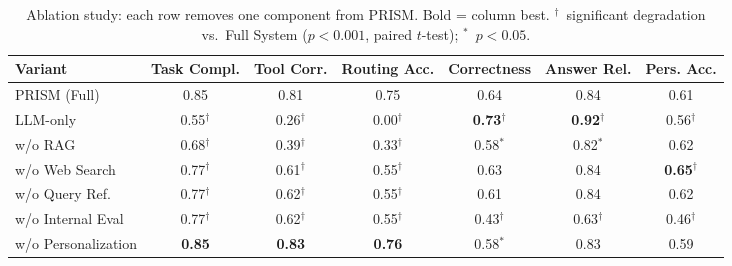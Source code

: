 \begin{table}[t]
\centering
\small
\caption{Ablation study: each row removes one component from PRISM. Bold = column best. $^\dagger$~significant degradation vs.\ Full System ($p < 0.001$, paired $t$-test); $^*$~$p < 0.05$.}
\label{tab:ablation}
\begin{tabular}{@{}lcccccc@{}}
\toprule
Variant & Task Compl. & Tool Corr. & Routing Acc. & Correctness & Answer Rel. & Pers. Acc. \\
\midrule
\textsc{PRISM} (Full) & 0.85 & 0.81 & 0.75 & 0.64 & 0.84 & 0.61 \\
LLM-only & 0.55$^\dagger$ & 0.26$^\dagger$ & 0.00$^\dagger$ & \textbf{0.73}$^\dagger$ & \textbf{0.92}$^\dagger$ & 0.56$^\dagger$ \\
\midrule
w/o RAG & 0.68$^\dagger$ & 0.39$^\dagger$ & 0.33$^\dagger$ & 0.58$^*$ & 0.82$^*$ & 0.62 \\
w/o Web Search & 0.77$^\dagger$ & 0.61$^\dagger$ & 0.55$^\dagger$ & 0.63 & 0.84 & \textbf{0.65}$^\dagger$ \\
w/o Query Ref. & 0.77$^\dagger$ & 0.62$^\dagger$ & 0.55$^\dagger$ & 0.61 & 0.84 & 0.62 \\
w/o Internal Eval & 0.77$^\dagger$ & 0.62$^\dagger$ & 0.55$^\dagger$ & 0.43$^\dagger$ & 0.63$^\dagger$ & 0.46$^\dagger$ \\
w/o Personalization & \textbf{0.85} & \textbf{0.83} & \textbf{0.76} & 0.58$^*$ & 0.83 & 0.59 \\
\bottomrule
\end{tabular}
\end{table}
